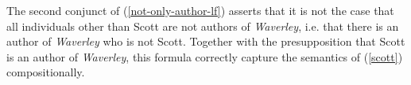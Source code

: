 The second conjunct of (\ref{not-only-author-lf}) asserts that it is not the case that all individuals other than Scott are not authors of \textit{Waverley}, i.e. that there is an author of \textit{Waverley} who is not Scott. Together with the presupposition that Scott is an author of \textit{Waverley}, this formula correctly capture the semantics of (\ref{scott}) compositionally.